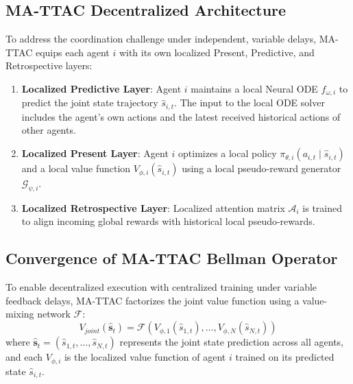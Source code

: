 \documentclass[manuscript, screen, review]{jair}
\begin{document}
\subsection{MA-TTAC Decentralized Architecture}
To address the coordination challenge under independent, variable delays, MA-TTAC equips each agent $i$ with its own localized Present, Predictive, and Retrospective layers:
\begin{enumerate}
    \item \textbf{Localized Predictive Layer}: Agent $i$ maintains a local Neural ODE $f_{\omega, i}$ to predict the joint state trajectory $\hat{s}_{i, t}$. The input to the local ODE solver includes the agent's own actions and the latest received historical actions of other agents.
    \item \textbf{Localized Present Layer}: Agent $i$ optimizes a local policy $\pi_{\theta, i}(a_{i, t} \mid \hat{s}_{i, t})$ and a local value function $V_{\phi, i}(\hat{s}_{i, t})$ using a local pseudo-reward generator $\mathcal{G}_{\psi, i}$.
    \item \textbf{Localized Retrospective Layer}: Localized attention matrix $\mathcal{A}_{i}$ is trained to align incoming global rewards with historical local pseudo-rewards.
\end{enumerate}

\subsection{Convergence of MA-TTAC Bellman Operator}
To enable decentralized execution with centralized training under variable feedback delays, MA-TTAC factorizes the joint value function using a value-mixing network $\mathcal{F}$:
\begin{equation}
    V_{joint}(\hat{\mathbf{s}}_t) = \mathcal{F}\left( V_{\phi, 1}(\hat{s}_{1, t}), \dots, V_{\phi, N}(\hat{s}_{N, t}) \right)
\end{equation}
where $\hat{\mathbf{s}}_t = (\hat{s}_{1, t}, \dots, \hat{s}_{N, t})$ represents the joint state prediction across all agents, and each $V_{\phi, i}$ is the localized value function of agent $i$ trained on its predicted state $\hat{s}_{i, t}$.
\end{document}
